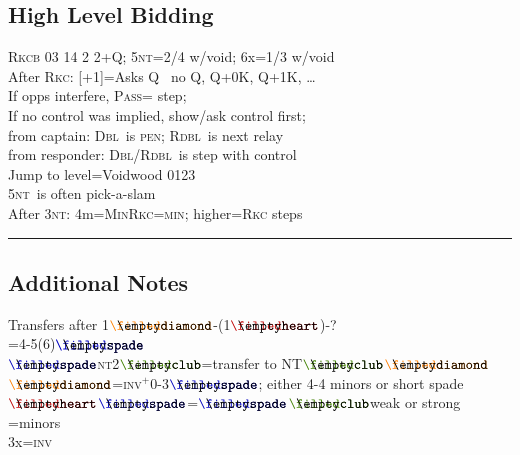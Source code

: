 \documentclass{article}
\newcommand\coloredsuitsymbol[3]{\ensuremath{\mathrel{\raisebox{-0.3pt}{{\color{#1}#2}\llap{#3}}}}}
\newcommand\suitsymbol[3]{\coloredsuitsymbol{#1}{#2}{#3}}%
\newcommand\C{\suitsymbol{clubcolor}{\filledclub}{\emptyclub}}
\newcommand\D{\suitsymbol{diamondcolor}{\filleddiamond}{\emptydiamond}}
\renewcommand\H{\suitsymbol{heartcolor}{\filledheart}{\emptyheart}}
\renewcommand\S{\suitsymbol{spadecolor}{\filledspade}{\emptyspade}}
\newcommand\N{\caps{nt}}
\newcommand\PASS{\caps{Pass}}
\newcommand\X{\caps{Dbl}}
\newcommand\XX{\caps{Rdbl}}
\newcommand\caps[1]{{\scshape#1}}
\newcommand\Min{\caps{min}}
\newcommand\INV{\caps{inv}}
\newcommand\more{\ensuremath{^+}}
\newcommand{\smallsection}[1]{\vspace{-1ex}\subsection*{#1}\raggedright}
\newcommand{\thinrule}{\rule{\textwidth}{\arrayrulewidth}}
\newcommand{\myendrule}{\vspace{-1.5ex}\thinrule}
\begin{document}
\begin{minipage}[t]{90mm}
\smallsection{High Level Bidding}
\caps{Rkcb} 03 14 2 2+Q; 5\N=2/4 w/void; 6x=1/3 w/void\\
After \caps{Rkc}: [+1]=Asks Q \rightarrow\ no Q, Q+0K, Q+1K, \ldots\\
If opps interfere, \PASS= step; \\
\quad If no control was implied, show/ask control first;\\
\quad from captain: \X\ is \caps{pen}; \XX\ is next relay\\
\quad from responder: \X/\XX\ is  step with control\\
Jump to  level=Voidwood 0123\\
5\N\ is often pick-a-slam\\
After 3\N: 4m=\caps{MinRkc}\rightarrow[+1]=\Min; higher=\caps{Rkc} steps\\
\myendrule
\end{minipage}
\hfill
\begin{minipage}[t]{90mm}
\smallsection{Additional Notes}
Transfers after 1\D-(1\H)-?\\
\quad\X=4-5(6)\S\\
\S\N2\C=transfer to NT\C\D\\
\D=\INV\more 0-3\S; either 4-4 minors or short spade\\
\H\S=\S\C weak or strong\\
\quad2\N=minors\\
\quad3x=\INV


\end{minipage}
\hfill\hfill
\end{document}
